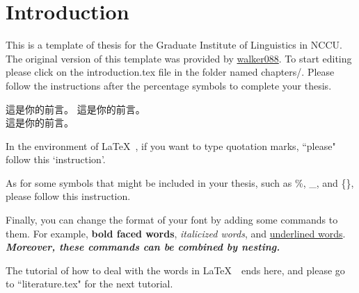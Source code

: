 \chapter{Introduction} %
\label{c:intro} %

This is a template of thesis for the Graduate Institute of Linguistics in NCCU. The original version of this template was provided by \href{https://github.com/Walker088/nccu-thesis}{walker088}. To start editing please click on the introduction.tex file in the folder named chapters/. Please follow the instructions after the percentage symbols to complete your thesis. \par %

這是你的前言。
這是你的前言。\\ %
這是你的前言。\par %


In the environment of \LaTeX \ , if you want to type quotation marks, ``please" follow this `instruction'.

As for some symbols that might be included in your thesis, such as \%, \_, and \{\}, please follow this instruction.

Finally, you can change the format of your font by adding some commands to them. For example, \textbf{bold faced words}, \textit{italicized words}, and \underline{underlined words}. \textbf{\textit{Moreover, these commands can be combined by nesting.}} \par

The tutorial of how to deal with the words in \LaTeX \ \ ends here, and please go to ``literature.tex" for the next tutorial.

